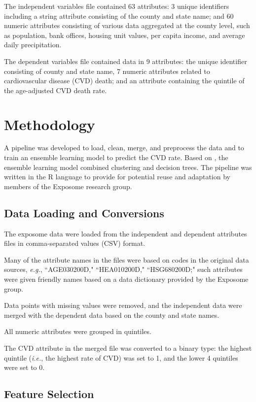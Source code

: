 \documentclass[conference,compsoc]{IEEEtran}
\begin{document}
The independent variables file contained 63 attributes: 3 unique identifiers including a string attribute consisting of the county and state name;
and 60 numeric attributes consisting of various data aggregated at the county level, such as population, bank offices, housing unit values, per capita income,
and average daily precipitation.

The dependent variables file contained data in 9 attributes: the unique identifier consisting of county and state name, 7 numeric attributes related to cardiovascular
disease (CVD) death; and an attribute containing the quintile of the age-adjusted CVD death rate.

\section{Methodology}

A pipeline was developed to load, clean, merge, and preprocess the data and to train an ensemble learning model to predict the
CVD rate. Based on \cite{datta}, the ensemble learning model combined clustering and decision trees. The pipeline was written
in the R language to provide for potential reuse and adaptation by members of the Exposome research group.

\subsection{Data Loading and Conversions}

The exposome data were loaded from the independent and dependent attributes files in comma-separated values (CSV) format.

Many of the attribute names in the files were based on codes in the original data sources, \textit{e.g.}, ``AGE030200D," ``HEA010200D," ``HSG680200D;"
such attributes were given friendly names based on a data dictionary provided by the Exposome group.

Data points with missing values were removed, and the independent data were merged with the dependent data based on the county and state names.

All numeric attributes were grouped in quintiles.

The CVD attribute in the merged file was converted to a binary type: the highest quintile (\textit{i.e.}, the highest rate of CVD) was set to 1,
and the lower 4 quintiles were set to 0.

\subsection{Feature Selection}
\end{document}
